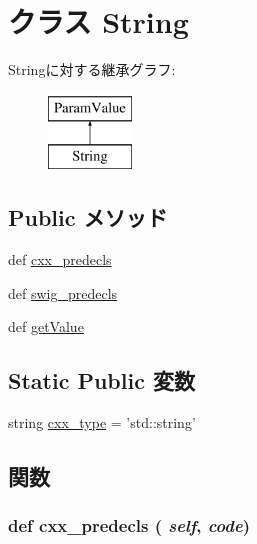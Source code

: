 \hypertarget{classm5_1_1params_1_1String}{
\section{クラス String}
\label{classm5_1_1params_1_1String}
}
Stringに対する継承グラフ:\begin{figure}[H]
\begin{center}
\leavevmode
\includegraphics[height=2cm]{classm5_1_1params_1_1String}
\end{center}
\end{figure}
\subsection*{Public メソッド}
\begin{DoxyCompactItemize}
\item 
def \hyperlink{classm5_1_1params_1_1String_a0b408a11a14bd1d770e28f71a6e14ab5}{cxx\_\-predecls}
\item 
def \hyperlink{classm5_1_1params_1_1String_ab3dbcf5716623eac67a8ccc074fa7e13}{swig\_\-predecls}
\item 
def \hyperlink{classm5_1_1params_1_1String_acc340fbd4335fa34f9d57fb454b28ed0}{getValue}
\end{DoxyCompactItemize}
\subsection*{Static Public 変数}
\begin{DoxyCompactItemize}
\item 
string \hyperlink{classm5_1_1params_1_1String_a2f1553ebb79374a68b36fdd6d8d82fc3}{cxx\_\-type} = 'std::string'
\end{DoxyCompactItemize}


\subsection{関数}
\hypertarget{classm5_1_1params_1_1String_a0b408a11a14bd1d770e28f71a6e14ab5}{
\subsubsection[{cxx\_\-predecls}]{\setlength{\rightskip}{0pt plus 5cm}def cxx\_\-predecls ( {\em self}, \/   {\em code})}}
\label{classm5_1_1params_1_1String_a0b408a11a14bd1d770e28f71a6e14ab5}


